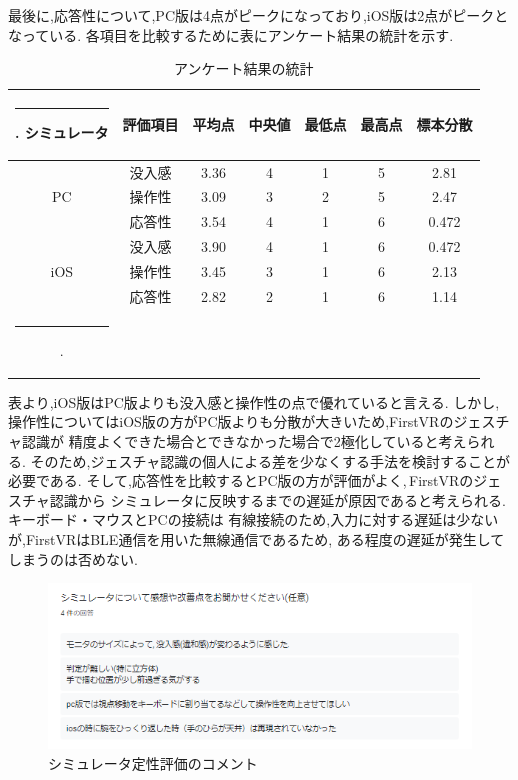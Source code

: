 \documentclass{ltjsreport}
\makeatletter
\def\Hline{
  \noalign{\ifnum0=`}\fi\hrule \@height 3.\arrayrulewidth \futurelet
  \reserved@a\@xhline}
\makeatother
\begin{document}
		最後に,応答性について,PC版は4点がピークになっており,iOS版は2点がピークとなっている.
\clearpage
		各項目を比較するために表にアンケート結果の統計を示す.
		\begin{table}[H]
		\begin{center}
		\caption{アンケート結果の統計}
		\label{tab:resoult}
		\begin{tabular}{cc|ccccc} \Hline
		シミュレータ&評価項目&平均点&中央値&最低点&最高点&標本分散\\ \hline
		&没入感&3.36&4&1&5&2.81\\
		PC&操作性&3.09&3&2&5&2.47\\
		&応答性&3.54&4&1&6&0.472\\ \hline
		&没入感&3.90&4&1&6&0.472\\
		iOS&操作性&3.45&3&1&6&2.13\\
		&応答性&2.82&2&1&6&1.14\\ \Hline
		\end{tabular}
		\end{center}
		\end{table}
		表より,iOS版はPC版よりも没入感と操作性の点で優れていると言える.
		しかし,操作性についてはiOS版の方がPC版よりも分散が大きいため,FirstVRのジェスチャ認識が
		精度よくできた場合とできなかった場合で2極化していると考えられる.
		そのため,ジェスチャ認識の個人による差を少なくする手法を検討することが必要である.
		そして,応答性を比較するとPC版の方が評価がよく,\,FirstVRのジェスチャ認識から
		シミュレータに反映するまでの遅延が原因であると考えられる.キーボード・マウスとPCの接続は
		有線接続のため,入力に対する遅延は少ないが,FirstVRはBLE通信を用いた無線通信であるため,
		ある程度の遅延が発生してしまうのは否めない.

		\begin{figure}[H]
		\centering
		\includegraphics[width = 12cm]{../figs/result.png}
		\caption{シミュレータ定性評価のコメント}
		\label{fig:comment}
		\end{figure}
		\vspace{-15pt}
		
\end{document}
